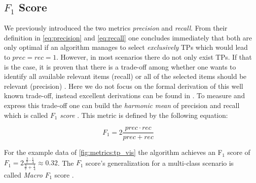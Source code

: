 \subsection{$F_1$ Score}
\label{chp:fundamentals:sec:metrics:subsec:f1_score}

We previously introduced the two metrics \textit{precision} and \textit{recall}.
From their definition in \cref{eq:precision} and \cref{eq:recall} one concludes immediately that both are only optimal if an algorithm manages to select \textit{exclusively} \acp{TP} which would lead to $prec = rec = 1$.
However, in most scenarios there do not only exist \acp{TP}.
If that is the case, it is proven that there is a trade-off among whether one wants to identify all available relevant items (recall) or all of the selected items should be relevant (precision) \parencite{Gordon:1989}.
Here we do not focus on the formal derivation of this well known trade-off, instead excellent derivations can be found in \textcites{Gordon:1989}{Zhu:2004}.
To measure and express this trade-off one can build the \textit{harmonic mean} of precision and recall which is called \textit{$F_1$ score} \parencite{Powers:2011}.
This metric is defined by the following equation:

\begin{equation}\label{eq:f1_score}
    F_1 = 2 \frac{prec \cdot rec}{prec+rec}
\end{equation}

For the example data of \cref{fig:metrics:tp_vis} the algorithm achieves an F$_1$ score of $F_1 = 2 \frac{\frac{3}{7} \cdot \frac{1}{4}}{\frac{3}{7}+\frac{1}{4}} \approx 0.32$.
The $F_1$ score's generalization for a multi-class scenario is called \textit{Macro $F_1$} score \parencite{Opitz:2019}.
